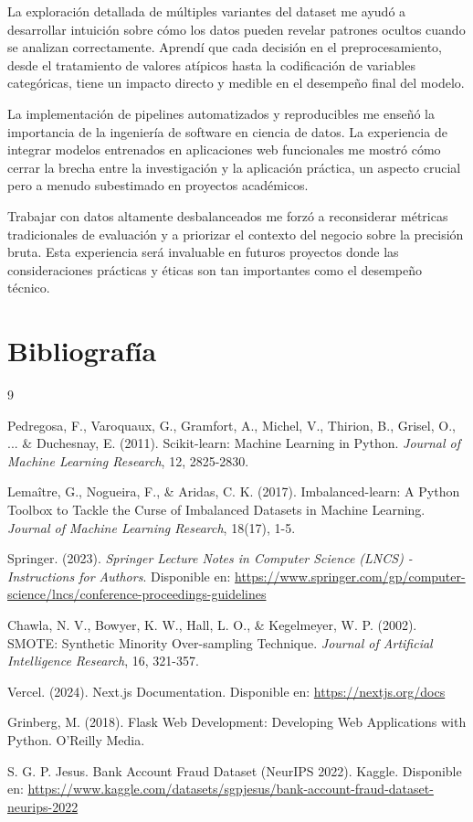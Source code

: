\documentclass{llncs}
\begin{document}
La exploración detallada de múltiples variantes del dataset me ayudó a desarrollar intuición sobre cómo los datos pueden revelar patrones ocultos cuando se analizan correctamente. Aprendí que cada decisión en el preprocesamiento, desde el tratamiento de valores atípicos hasta la codificación de variables categóricas, tiene un impacto directo y medible en el desempeño final del modelo.

La implementación de pipelines automatizados y reproducibles me enseñó la importancia de la ingeniería de software en ciencia de datos. La experiencia de integrar modelos entrenados en aplicaciones web funcionales me mostró cómo cerrar la brecha entre la investigación y la aplicación práctica, un aspecto crucial pero a menudo subestimado en proyectos académicos.

Trabajar con datos altamente desbalanceados me forzó a reconsiderar métricas tradicionales de evaluación y a priorizar el contexto del negocio sobre la precisión bruta. Esta experiencia será invaluable en futuros proyectos donde las consideraciones prácticas y éticas son tan importantes como el desempeño técnico.


\section{Bibliografía}

\begin{thebibliography}{9}

Pedregosa, F., Varoquaux, G., Gramfort, A., Michel, V., Thirion, B., Grisel, O., ... \& Duchesnay, E. (2011). 
Scikit-learn: Machine Learning in Python. \textit{Journal of Machine Learning Research}, 12, 2825-2830.

Lemaître, G., Nogueira, F., \& Aridas, C. K. (2017). 
Imbalanced-learn: A Python Toolbox to Tackle the Curse of Imbalanced Datasets in Machine Learning. 
\textit{Journal of Machine Learning Research}, 18(17), 1-5.

Springer. (2023). \textit{Springer Lecture Notes in Computer Science (LNCS) - Instructions for Authors}. 
Disponible en: \url{https://www.springer.com/gp/computer-science/lncs/conference-proceedings-guidelines}

Chawla, N. V., Bowyer, K. W., Hall, L. O., \& Kegelmeyer, W. P. (2002). 
SMOTE: Synthetic Minority Over-sampling Technique. \textit{Journal of Artificial Intelligence Research}, 16, 321-357.

Vercel. (2024). Next.js Documentation. Disponible en: \url{https://nextjs.org/docs}

Grinberg, M. (2018). Flask Web Development: Developing Web Applications with Python. O'Reilly Media.

S. G. P. Jesus. Bank Account Fraud Dataset (NeurIPS 2022). Kaggle. Disponible en: \url{https://www.kaggle.com/datasets/sgpjesus/bank-account-fraud-dataset-neurips-2022}

\end{thebibliography}
\end{document}
